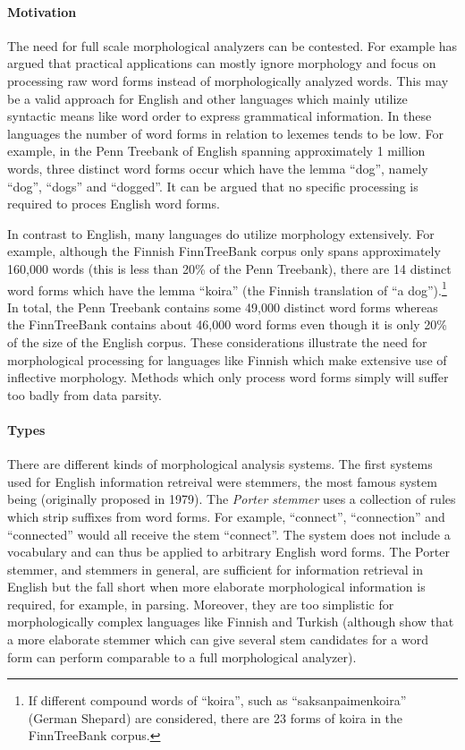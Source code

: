 \paragraph{Motivation} The need for full scale morphological analyzers
can be contested. For example \cite{somone} has argued that practical
applications can mostly ignore morphology and focus on processing raw
word forms instead of morphologically analyzed words. This may be a
valid approach for English and other languages which mainly utilize
syntactic means like word order to express grammatical information. In
these languages the number of word forms in relation to lexemes tends
to be low. For example, in the Penn Treebank of English
\cite{Marcus1993} spanning approximately 1 million words, three
distinct word forms occur which have the lemma ``dog'', namely
``dog'', ``dogs'' and ``dogged''. It can be argued that no specific
processing is required to proces English word forms.

In contrast to English, many languages do utilize morphology
extensively. For example, although the Finnish FinnTreeBank corpus
\cite{someone} only spans approximately 160,000 words (this is less
than 20\% of the Penn Treebank), there are 14 distinct word forms
which have the lemma ``koira'' (the Finnish translation of ``a
dog'').\footnote{If different compound words of ``koira'', such as
  ``saksanpaimenkoira'' (German Shepard) are considered, there are 23
  forms of koira in the FinnTreeBank corpus.}  In total, the Penn
Treebank contains some 49,000 distinct word forms whereas the
FinnTreeBank contains about 46,000 word forms even though it is only
20\% of the size of the English corpus. These considerations
illustrate the need for morphological processing for languages like
Finnish which make extensive use of inflective morphology. Methods
which only process word forms simply will suffer too badly from data
parsity.

\paragraph{Types} There are different kinds of morphological analysis
systems. The first systems used for English information retreival were
stemmers, the most famous system being \cite{Porter1997} (originally
proposed in 1979). The {\it Porter stemmer} uses a collection of rules
which strip suffixes from word forms. For example, ``connect'',
``connection'' and ``connected'' would all receive the stem
``connect''. The system does not include a vocabulary and can thus be
applied to arbitrary English word forms. The Porter stemmer, and
stemmers in general, are sufficient for information retrieval in
English but the fall short when more elaborate morphological
information is required, for example, in parsing. Moreover, they are
too simplistic for morphologically complex languages like Finnish and
Turkish (although \cite{Kettunen2005} show that a more elaborate
stemmer which can give several stem candidates for a word form can
perform comparable to a full morphological analyzer).

